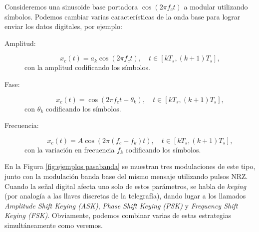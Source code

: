 Consideremos una sinusoide base portadora $\cos(2\pi f_c t)$ a modular utilizando símbolos. Podemos cambiar varias características de la onda base para lograr enviar los datos digitales, por ejemplo:
\begin{description}
    \item[Amplitud:] 
    \begin{equation*}
        x_c(t) = a_k \cos(2\pi f_c t), \quad t\in[kT_s,(k+1)T_s],
    \end{equation*}
    con la amplitud codificando los símbolos.
    \item[Fase:] 
    \begin{equation*}
        x_c(t) = \cos(2\pi f_c t + \theta_k), \quad t\in[kT_s,(k+1)T_s],
    \end{equation*}
    con $\theta_k$ codificando los símbolos.
    \item[Frecuencia: ] 
    \begin{equation*}
        x_c(t) = A \cos\left(2\pi (f_c+f_k) t\right), \quad t\in[kT_s,(k+1)T_s],
    \end{equation*}
     con la variación en frecuencia $f_k$ codificando los símbolos.
\end{description}
En la Figura \ref{fig:ejemplos pasabanda} se muestran tres modulaciones de este tipo, junto con la modulación banda base del mismo mensaje utilizando pulsos NRZ. Cuando la señal digital afecta uno solo de estos parámetros, se habla de \emph{keying} (por analogía a las llaves discretas de la telegrafía), dando lugar a los llamados \emph{Amplitude Shift Keying (ASK)}, \emph{Phase Shift Keying (PSK)} y \emph{Frequency Shift Keying (FSK)}. Obviamente, podemos combinar varias de estas estrategias simultáneamente como veremos.

